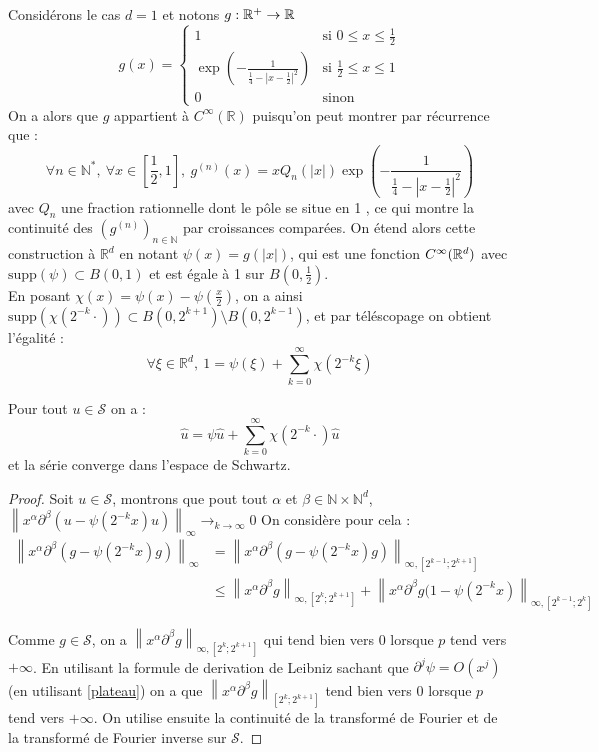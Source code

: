 \documentclass[11pt,a4paper]{article}
\begin{document}
Considérons le cas $d=1$ et notons  $g: \mathbb R^+ \to \mathbb R$
\[ g(x) = \begin{cases} 
1 & \text{si } 0 \leq x \leq \frac{1}{2} \\
\exp\left(-\frac{1}{\frac{1}{4} - |x - \frac{1}{2}|^2}\right) & \text{si } \frac{1}{2} \leq x \leq 1 \\
0 & \text{sinon} \end{cases}
\]
On a alors que $g$ appartient à $C^\infty(\mathbb{R})$ puisqu'on peut montrer par récurrence que :
\begin{equation}\label{plateau}
\forall n \in \mathbb{N}^*, \ \forall x \in \left[\frac{1}{2}, 1\right], \ g^{(n)}(x) = x Q_n(|x|) \exp\left(-\frac{1}{\frac{1}{4} - |x - \frac{1}{2}|^2}\right)
\end{equation}
avec $Q_n$ une fraction rationnelle dont le pôle se situe en 1 , ce qui montre la continuité des $(g^{(n)})_{n \in \mathbb{N}}$ par croissances comparées. On étend alors cette construction à $\mathbb{R}^d$ en notant $\psi(x)=g(|x|)$, qui est une fonction $C^\infty(\mathbb R^d)$ avec $\text{supp}(\psi) \subset B(0,1)$ et est égale à 1 sur $B(0,\frac{1}{2})$. \\
En posant $\chi(x)=\psi(x)-\psi\left(\frac{x}{2}\right)$, on a ainsi $\text{supp}(\chi(2^{-k} \cdot)) \subset B(0,2^{k+1}) \setminus B(0,2^{k-1})$, et par téléscopage on obtient l'égalité  :
\begin{equation*}
 \forall \xi \in \mathbb{R}^d, \ 1= \psi(\xi) + \sum_{k=0}^\infty \chi(2^{-k} \xi)
\end{equation*}

\begin{lemma}\label{decomp}
Pour tout $u \in \mathcal{S}$ on a :
\[ \hat{u} = \psi \hat{u} + \sum_{k=0}^\infty \chi(2^{-k} \cdot) \hat{u} \]
et la série converge dans l'espace de Schwartz.
\end{lemma}
\begin{proof}
Soit $u \in \mathcal{S}$, montrons que pout tout $\alpha$ et $\beta \in \mathbb{N}\times \mathbb{N}^d $, $\left\lVert x^\alpha \partial^\beta(u-\psi(2^{-k}x)u) \right\rVert_\infty \to_{k\to \infty} 0$
On considère pour cela :
\begin{align*}
    \left\lVert x^\alpha \partial^\beta(g-\psi(2^{-k}x)g)\right\rVert_\infty &= \left\lVert x^\alpha \partial^\beta(g-\psi(2^{-k}x)g)\right\rVert_{\infty,[2^{k-1};2^{k+1}]} \\
    &\leq \left\lVert x^\alpha \partial^\beta g\right\rVert_{\infty,[2^{k};2^{k+1}]} + \left\lVert x^\alpha \partial^\beta g(1-\psi(2^{-k}x)\right\rVert_{\infty,[2^{k-1};2^{k}]}
\end{align*}

Comme $g \in \mathcal{S}$, on a $\left\lVert x^\alpha \partial^\beta g\right\rVert_{\infty,[2^{k};2^{k+1}]}$ qui tend bien vers 0 lorsque $p$ tend vers $+\infty$. En utilisant la formule de derivation de Leibniz sachant que $\partial^j \psi = O(x^{j})$ (en utilisant \eqref{plateau}) on a que $\left\lVert x^\alpha \partial^\beta g\right\rVert_{[2^{k};2^{k+1}]}$ tend bien vers 0 lorsque $p$ tend vers $+\infty$. On utilise ensuite la continuité de la transformé de Fourier et de la transformé de Fourier inverse sur $\mathcal{S}$.
\end{proof}
\end{document}
